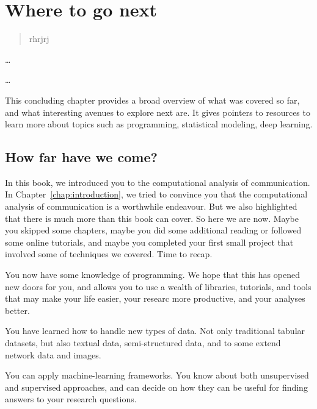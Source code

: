 \chapter{Where to go next}
\label{chap:wherenext}

\begin{abstract}
rhrjrj
\end{abstract}



\begin{objectives}
\item \ldots
\item \ldots
\end{objectives}

\begin{feature}
This concluding chapter provides a broad overview of what was covered so far, and what interesting avenues to explore next are. It gives pointers to resources to learn more about topics such as programming, statistical modeling, deep learning.

\end{feature}



\section{How far have we come?}
In this book, we introduced you to the computational analysis of communication. In Chapter~\ref{chap:introduction}, we tried to convince you that the computational analysis of communication is a worthwhile endeavour. But we also highlighted that there is much more than this book can cover.
So here we are now. Maybe you skipped some chapters, maybe you did some additional reading or followed some online tutorials, and maybe you completed your first small project that involved some of techniques we covered. Time to recap.

You now have some knowledge of programming. We hope that this has opened new doors for you, and allows you to use a wealth of libraries, tutorials, and tools that may make your life easier, your researc more productive, and your analyses better.

You have learned how to handle new types of data. Not only traditional tabular datasets, but also textual data, semi-structured data, and to some extend network data and images.

You can apply machine-learning frameworks. You know about both unsupervised and supervised approaches, and can decide on how they can be useful for finding answers to your research questions.

